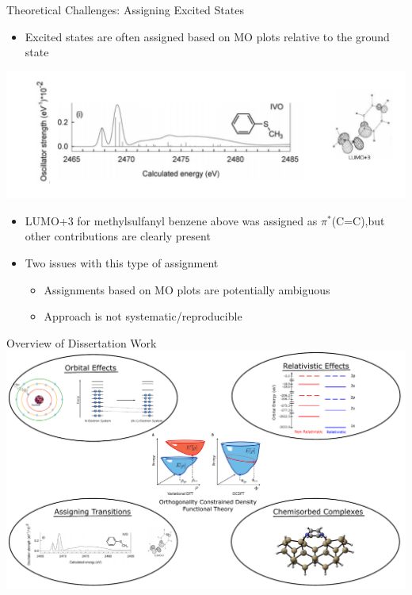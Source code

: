\documentclass[t]{beamer}
\begin{document}
\begin{frame}{Theoretical Challenges: Assigning Excited States}
\begin{itemize}
\item Excited states are often assigned based on MO plots relative to the ground state
\end{itemize}
\centering
\includegraphics[width=\linewidth]{behyan_fig.pdf}
\begin{itemize}
\item LUMO+3 for methylsulfanyl benzene above was assigned as $\pi^*$(C=C),\footnotemark  but other contributions are clearly present
\item Two issues with this type of assignment
		\begin{itemize}
		\item Assignments based on MO plots are potentially ambiguous
		\item Approach is not systematic/reproducible
		\end{itemize}
\end{itemize}
\end{frame}

\begin{frame}{Overview of Dissertation Work}
\centering
\includegraphics[width=\linewidth]{dissertation_work_overview.pdf}
\end{frame}
\end{document}
